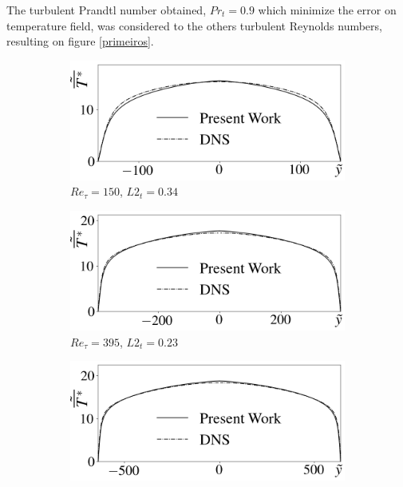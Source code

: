 \documentclass[10pt]{article} %
\begin{document}
The turbulent Prandtl number obtained, $Pr_t = 0.9$ which minimize the error on temperature field, was considered to the others turbulent Reynolds numbers, resulting on figure \ref{primeiros}.
\begin{figure}[!h]
	\centering
	\begin{subfigure}[t]{0.5\textwidth}
		\centering
		\includegraphics[angle=0, scale=0.24]{fotos_formatacao_final/Temperature_150_071_Prt0905_A26}
		\caption{$Re_\tau = 150$, $L2_t = 0.34$}
	\end{subfigure}
	\begin{subfigure}[t]{0.45\textwidth}
		\centering
		\includegraphics[angle=0, scale=0.24]{fotos_formatacao_final/Temperature_395_071_Prt0905_A26}
		\caption{$Re_\tau = 395$, $L2_t = 0.23$}
	\end{subfigure}
	\begin{subfigure}[t]{0.5\textwidth}
		\centering
		\includegraphics[angle=0, scale=0.24]{fotos_formatacao_final/Temperature_640_071_Prt0905_A26}

\end{subfigure}
\end{figure}
\end{document}
